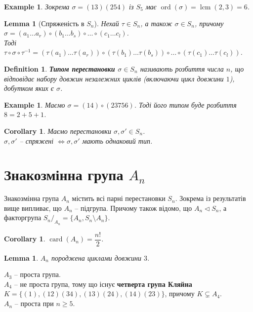 \documentclass[a4paper, 10pt]{article}
\theoremstyle{theoremdd}
\theoremstyle{theoremdd}
\newtheorem{definition}[theorem]{Definition}
\theoremstyle{theoremdd}
\theoremstyle{theoremdd}
\theoremstyle{theoremdd}
\newtheorem{example}[theorem]{Example}
\theoremstyle{theoremdd}
\theoremstyle{theoremdd}
\theoremstyle{theoremdd}
\theoremstyle{theoremdd}
\theoremstyle{theoremdd}
\theoremstyle{theoremdd}
\theoremstyle{theoremdd}
\theoremstyle{theoremdd}
\newtheorem{lemma}[theorem]{Lemma}
\theoremstyle{theoremdd}
\newtheorem{corollary}[theorem]{Corollary}
\theoremstyle{theoremdd}
\DeclareMathOperator{\ord}{ord}
\DeclareMathOperator{\card}{card}
\DeclareMathOperator{\lcm}{lcm}
\begin{document}
\begin{example}
Зокрема $\sigma = (13) (254)$ із $S_5$ має $\ord(\sigma) = \lcm(2,3) = 6$.
\end{example}

\begin{lemma}[Спряженість в $S_n$]
Нехай $\tau \in S_n$, а також $\sigma \in S_n$, причому\\
$\sigma = (a_1 \dots a_r) \circ (b_1 \dots b_s) \circ \dots \circ (c_1 \dots c_l)$.\\
Тоді $\tau \circ \sigma \circ \tau^{-1} = (\tau(a_1)\dots \tau(a_r)) \circ (\tau(b_1)\dots \tau(b_s)) \circ \dots \circ (\tau(c_1)\dots \tau(c_l))$.
\end{lemma}

\begin{definition}
\textbf{Типом перестановки $\sigma \in S_n$} називають розбиття числа $n$, що відповідає набору довжин незалежних циклів (включаючи цикл довжини $1$), добутком яких є $\sigma$.
\end{definition}

\begin{example}
Маємо $\sigma = (14) \circ (23756)$. Тоді його типом буде розбиття $8 = 2 + 5 + 1$.
\end{example}

\begin{corollary}
Маємо перестановки $\sigma, \sigma' \in S_n$.\\
$\sigma, \sigma'$ -- спряжені $\iff \sigma, \sigma'$ мають однаковий тип.
\end{corollary}

\section*{Знакозмінна група $A_n$}
Знакозмінна група $A_n$ містить всі парні перестановки $S_n$. Зокрема із результатів вище випливає, що $A_n$ -- підгрупа. Причому також відомо, що $A_n \triangleleft S_n$, а факторгрупа ${S_n}/_{A_n} = \{ A_n, S_n \setminus A_n\}$.

\begin{corollary}
$\card (A_n) = \dfrac{n!}{2}$.
\end{corollary}

\begin{lemma}
$A_n$ породжена циклами довжини $3$.
\end{lemma}

$A_3$ -- проста група.\\
$A_4$ -- не проста група, тому що існує \textbf{четверта група Кляйна} $K = \{(1),(12)(34),(13)(24),(14)(23)\}$, причому $K \subsetneq A_4$.\\
$A_n$ -- проста при $n \geq 5$.
\end{document}
